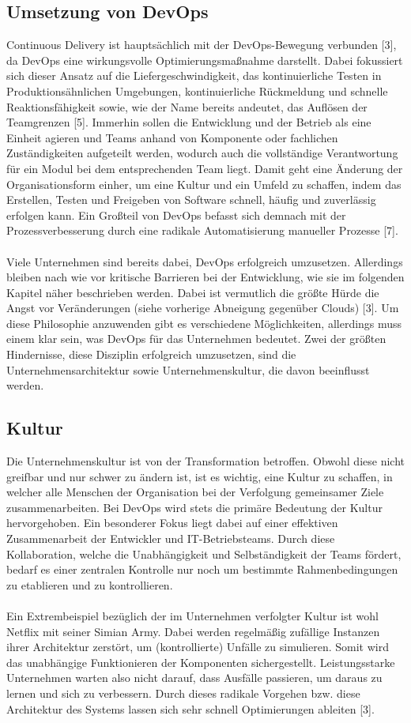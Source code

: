\subsection{Umsetzung von DevOps}
Continuous Delivery ist hauptsächlich mit der DevOps-Bewegung verbunden [3], da DevOps eine wirkungsvolle Optimierungsmaßnahme darstellt. Dabei fokussiert sich dieser Ansatz auf die Liefergeschwindigkeit, das kontinuierliche Testen in Produktionsähnlichen Umgebungen, kontinuierliche Rückmeldung und schnelle Reaktionsfähigkeit sowie, wie der Name bereits andeutet, das Auflösen der Teamgrenzen [5]. Immerhin sollen die Entwicklung und der Betrieb als eine Einheit agieren und Teams anhand von Komponente oder fachlichen Zuständigkeiten aufgeteilt werden, wodurch auch die vollständige Verantwortung für ein Modul bei dem entsprechenden Team liegt. Damit geht eine Änderung der Organisationsform einher, um eine Kultur und ein Umfeld zu schaffen, indem das Erstellen, Testen und Freigeben von Software schnell, häufig und zuverlässig erfolgen kann. Ein Großteil von DevOps befasst sich demnach mit der Prozessverbesserung durch eine radikale Automatisierung manueller Prozesse [7]. \\ \\
Viele Unternehmen sind bereits dabei, DevOps erfolgreich umzusetzen. Allerdings bleiben nach wie vor kritische Barrieren bei der Entwicklung, wie sie im folgenden Kapitel näher beschrieben werden. Dabei ist vermutlich die größte Hürde die Angst vor Veränderungen (siehe vorherige Abneigung gegenüber Clouds) [3]. Um diese Philosophie anzuwenden gibt es verschiedene Möglichkeiten, allerdings muss einem klar sein, was DevOps für das Unternehmen bedeutet. Zwei der größten Hindernisse, diese Disziplin erfolgreich umzusetzen, sind die Unternehmensarchitektur sowie Unternehmenskultur, die davon beeinflusst werden.

\subsection{Kultur}
Die Unternehmenskultur ist von der Transformation betroffen. Obwohl diese nicht greifbar und nur schwer zu ändern ist, ist es wichtig, eine Kultur zu schaffen, in welcher alle Menschen der Organisation bei der Verfolgung gemeinsamer Ziele zusammenarbeiten. Bei DevOps wird stets die primäre Bedeutung der Kultur hervorgehoben. Ein besonderer Fokus liegt dabei auf einer effektiven Zusammenarbeit der Entwickler und IT-Betriebsteams. Durch diese Kollaboration, welche die Unabhängigkeit und Selbständigkeit der Teams fördert, bedarf es einer zentralen Kontrolle nur noch um bestimmte Rahmenbedingungen zu etablieren und zu kontrollieren.\\ \\    
Ein Extrembeispiel bezüglich der im Unternehmen verfolgter Kultur ist wohl Netflix mit seiner Simian Army. Dabei werden regelmäßig zufällige Instanzen ihrer Architektur zerstört, um (kontrollierte) Unfälle zu simulieren. Somit wird das unabhängige Funktionieren der Komponenten sichergestellt. Leistungsstarke Unternehmen warten also nicht darauf, dass Ausfälle passieren, um daraus zu lernen und sich zu verbessern. Durch dieses radikale Vorgehen bzw. diese Architektur des Systems lassen sich sehr schnell Optimierungen ableiten [3].

